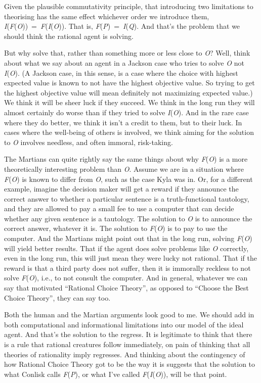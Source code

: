 \documentclass[
  10pt,
  letterpaper,
  DIV=11,
  numbers=noendperiod,
  twoside]{scrartcl}
\begin{document}
Given the plausible commutativity principle, that introducing two
limitations to theorising has the same effect whichever order we
introduce them,
\emph{I}(\emph{F}(\emph{O}))~=~\emph{F}(\emph{I}(\emph{O})). That is,
\emph{F}(\emph{P})~=~\emph{I}(\emph{Q}). And that's the problem that we
should think the rational agent is solving.

But why solve that, rather than something more or less close to
\emph{O}? Well, think about what we say about an agent in a Jackson case
who tries to solve \emph{O} not \emph{I}(\emph{O}). (A Jackson case, in
this sense, is a case where the choice with highest expected value is
known to not have the highest objective value. So trying to get the
highest objective value will mean definitely not maximizing expected
value.) We think it will be sheer luck if they succeed. We think in the
long run they will almost certainly do worse than if they tried to solve
\emph{I}(\emph{O}). And in the rare case where they do better, we think
it isn't a credit to them, but to their luck. In cases where the
well-being of others is involved, we think aiming for the solution to
\emph{O} involves needless, and often immoral, risk-taking.

The Martians can quite rightly say the same things about why
\emph{F}(\emph{O}) is a more theoretically interesting problem than
\emph{O}. Assume we are in a situation where \emph{F}(\emph{O}) is known
to differ from \emph{O}, such as the case Kyla was in. Or, for a
different example, imagine the decision maker will get a reward if they
announce the correct answer to whether a particular sentence is a
truth-functional tautology, and they are allowed to pay a small fee to
use a computer that can decide whether any given sentence is a
tautology. The solution to \emph{O} is to announce the correct answer,
whatever it is. The solution to \emph{F}(\emph{O}) is to pay to use the
computer. And the Martians might point out that in the long run, solving
\emph{F}(\emph{O}) will yield better results. That if the agent does
solve problems like \emph{O} correctly, even in the long run, this will
just mean they were lucky not rational. That if the reward is that a
third party does not suffer, then it is immorally reckless to not solve
\emph{F}(\emph{O}), i.e., to not consult the computer. And in general,
whatever we can say that motivated ``Rational Choice Theory'', as
opposed to ``Choose the Best Choice Theory'', they can say too.

Both the human and the Martian arguments look good to me. We should add
in both computational and informational limitations into our model of
the ideal agent. And that's the solution to the regress. It is
legitimate to think that there is a rule that rational creatures follow
immediately, on pain of thinking that all theories of rationality imply
regresses. And thinking about the contingency of how Rational Choice
Theory got to be the way it is suggests that the solution to what
Conlisk calls \emph{F}(\emph{P}), or what I've called
\emph{F}(\emph{I}(\emph{O})), will be that point.
\end{document}
